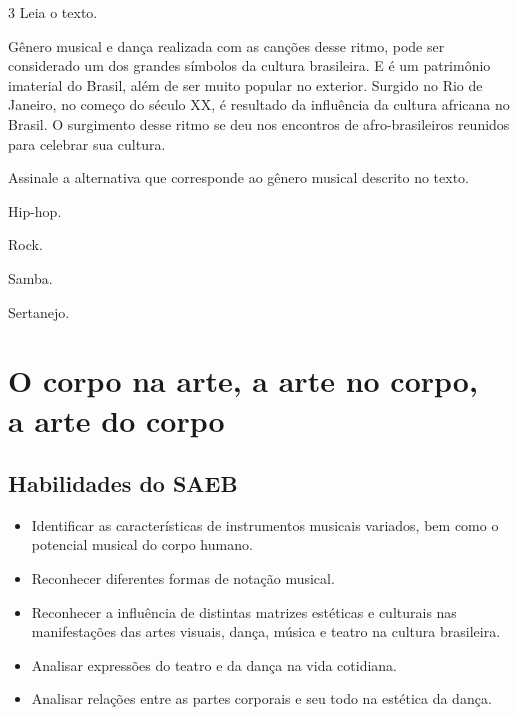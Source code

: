\num{3}  Leia o texto.

\begin{myquote}
Gênero musical e dança realizada com as canções desse ritmo, pode ser considerado um dos
grandes símbolos da cultura brasileira. E é um patrimônio imaterial do Brasil, além de
ser muito popular no exterior. Surgido no Rio de Janeiro, no começo do século XX, é
resultado da influência da cultura africana no Brasil. O surgimento desse ritmo se deu
nos encontros de afro-brasileiros reunidos para celebrar sua cultura.
\end{myquote}

Assinale a alternativa que corresponde ao gênero musical descrito no texto.

\begin{escolha}
\item
  Hip-hop.
\item
  Rock.
\item
  Samba.
\item
  Sertanejo.
\end{escolha}


\chapter[O corpo na arte, a arte no corpo, a arte do corpo]{\Large O corpo na arte, a arte no corpo,\\ a arte do corpo}

\vspace*{-1\baselineskip}

\section*{Habilidades do SAEB}

\begin{itemize}
\item Identificar as características de instrumentos musicais variados, bem
como o potencial musical do corpo humano.

\item Reconhecer diferentes formas de notação musical.

\item Reconhecer a influência de distintas matrizes estéticas e culturais
nas manifestações das artes visuais, dança, música e teatro na cultura
brasileira.

\item Analisar expressões do teatro e da dança na vida cotidiana.

\item Analisar relações entre as partes corporais e seu todo na estética da dança.
\end{itemize}

